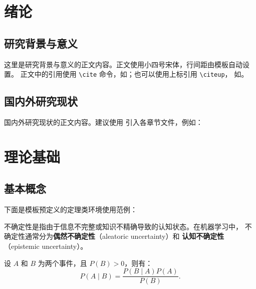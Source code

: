 \documentclass{nefuthesis}
\begin{document}
\begin{thesis}

\section{绪论}

\subsection{研究背景与意义}

这里是研究背景与意义的正文内容。正文使用小四号宋体，行间距由模板自动设置。
正文中的引用使用 \verb|\cite| 命令，如\cite{B-UMethod1}；也可以使用上标引用 \verb|\citeup|，
如。

\subsection{国内外研究现状}

国内外研究现状的正文内容。建议使用 \verb|| 引入各章节文件，例如：
% 

\section{理论基础}

\subsection{基本概念}

下面是模板预定义的定理类环境使用范例：

\begin{definition}[不确定性]
不确定性是指由于信息不完整或知识不精确导致的认知状态。在机器学习中，
不确定性通常分为\textbf{偶然不确定性}（aleatoric uncertainty）和
\textbf{认知不确定性}（epistemic uncertainty）。
\end{definition}

\begin{theorem}[贝叶斯定理]
设 $A$ 和 $B$ 为两个事件，且 $P(B) > 0$，则有：
\begin{equation}
    P(A \mid B) = \frac{P(B \mid A) P(A)}{P(B)}.
    \label{eq:bayes}
\end{equation}
\end{theorem}


\end{thesis}
\end{document}
